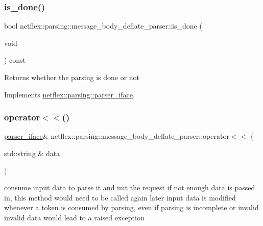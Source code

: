 \subsubsection{\texorpdfstring{is\+\_\+done()}{is\_done()}}
{\footnotesize\ttfamily bool netflex\+::parsing\+::message\+\_\+body\+\_\+deflate\+\_\+parser\+::is\+\_\+done (\begin{DoxyParamCaption}\item[{void}]{ }\end{DoxyParamCaption}) const\hspace{0.3cm}{\ttfamily [virtual]}}

\begin{DoxyReturn}{Returns}
whether the parsing is done or not 
\end{DoxyReturn}


Implements \hyperlink{classnetflex_1_1parsing_1_1parser__iface_afebd1cc50d5958f712dfac0c023fd162}{netflex\+::parsing\+::parser\+\_\+iface}.

\mbox{\label{classnetflex_1_1parsing_1_1message__body__deflate__parser_ad307d37f712b3e425bb2535f88546791}} 
\subsubsection{\texorpdfstring{operator$<$$<$()}{operator<<()}}
{\footnotesize\ttfamily \hyperlink{classnetflex_1_1parsing_1_1parser__iface}{parser\+\_\+iface}\& netflex\+::parsing\+::message\+\_\+body\+\_\+deflate\+\_\+parser\+::operator$<$$<$ (\begin{DoxyParamCaption}\item[{std\+::string \&}]{data }\end{DoxyParamCaption})\hspace{0.3cm}{\ttfamily [virtual]}}

consume input data to parse it and init the request if not enough data is passed in, this method would need to be called again later input data is modified whenever a token is consumed by parsing, even if parsing is incomplete or invalid invalid data would lead to a raised exception


